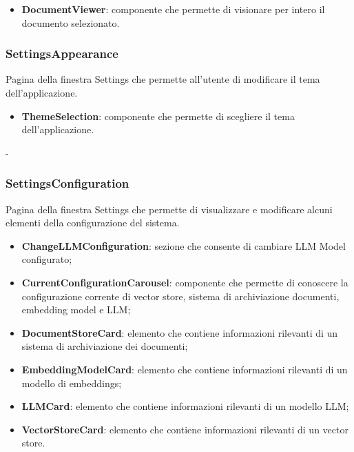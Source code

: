 \documentclass[10pt, a4paper]{article}
\begin{document}
\begin{itemize}
    \item \label{DocumentViewer}\textbf{DocumentViewer}: componente che permette di visionare per intero il documento selezionato.
\end{itemize}



\subsubsection{SettingsAppearance}
Pagina della finestra Settings che permette all'utente di modificare il tema dell'applicazione.
\begin{itemize}
    \item \label{ThemeSelection}\textbf{ThemeSelection}: componente che permette di scegliere il tema dell'applicazione.
\end{itemize}
 -



\subsubsection{SettingsConfiguration}

Pagina della finestra Settings che permette di visualizzare e modificare alcuni elementi della configurazione del sistema.
\begin{itemize}
    \item \label{ChangeLLMConfiguration}\textbf{ChangeLLMConfiguration}: sezione che consente di cambiare LLM Model configurato;
    \item \label{CurrentConfigurationCarousel}\textbf{CurrentConfigurationCarousel}: componente che permette di conoscere la configurazione corrente di vector store, sistema di archiviazione documenti, embedding model e LLM;
    \item \label{DocumentStoreCard}\textbf{DocumentStoreCard}: elemento che contiene informazioni rilevanti di un sistema di archiviazione dei documenti;
    \item \label{EmbeddingModelCard}\textbf{EmbeddingModelCard}: elemento che contiene informazioni rilevanti di un modello di embeddings;
    \item \label{LLMCard}\textbf{LLMCard}: elemento che contiene informazioni rilevanti di un modello LLM; 
    \item \label{VectorStoreCard}\textbf{VectorStoreCard}: elemento che contiene informazioni rilevanti di un vector store.
    
    
\end{itemize}
\end{document}
